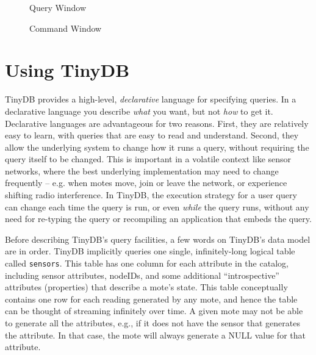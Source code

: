 \documentclass[11pt]{article}
\begin{document}
\begin{figure}
\begin{minipage}{4in}
\begin{center}
\leavevmode
{}
\end{center}
\caption{Query Window}
\label{fig:query}

\end{minipage}
\hspace{.5in}
\begin{minipage}{2in}
\begin{center}
\leavevmode
{}
\end{center}
\caption{Command Window}
\label{fig:command}
\end{minipage}
\end{figure}

\section{Using TinyDB}
\label{sec:queries}
TinyDB provides a high-level, {\em declarative}
language for specifying queries.  In a declarative language you
describe {\em what} you want, but not {\em how} to get it.
Declarative languages are advantageous for two reasons.  First, they
are relatively easy to learn, with queries that are easy to read and
understand.  Second, they allow the underlying system to change how it
runs a query, without requiring the query itself to be changed.  This
is important in a volatile context like sensor networks, where the
best underlying implementation may need to change frequently --
e.g. when motes move, join or leave the network, or experience
shifting radio interference.  In TinyDB, the execution strategy for a
user query can change each time the query is run, or even {\em while}
the query runs, without any need for re-typing the query or
recompiling an application that embeds the query.

Before describing TinyDB's query facilities, a few words on
TinyDB's data model are in order.  TinyDB implicitly queries one
single, infinitely-long logical table called {\tt sensors}.  This
table has one column for each attribute in the catalog, including
sensor attributes, nodeIDs, and some additional ``introspective''
attributes (properties) that describe a mote's state.  This table conceptually
contains one row for each reading generated by any mote, and hence the
table can be thought of streaming infinitely over time.  A given mote
may not be able to generate all the attributes, e.g., if it does not
have the sensor that generates the attribute.  In that case, the mote
will always generate a NULL value for that attribute.
\end{document}
